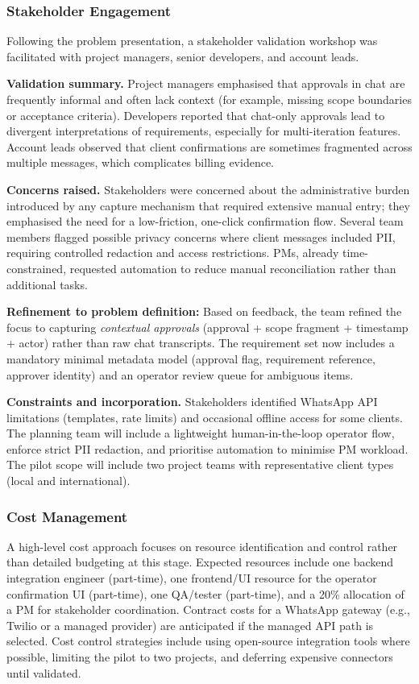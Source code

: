 \documentclass[12pt,a4paper]{report}
\begin{document}
\subsubsection{Stakeholder Engagement}
Following the problem presentation, a stakeholder validation workshop was facilitated with project managers, senior developers, and account leads.

\textbf{Validation summary.} Project managers emphasised that approvals in chat are frequently informal and often lack context (for example, missing scope boundaries or acceptance criteria). Developers reported that chat-only approvals lead to divergent interpretations of requirements, especially for multi-iteration features. Account leads observed that client confirmations are sometimes fragmented across multiple messages, which complicates billing evidence.

\textbf{Concerns raised.} Stakeholders were concerned about the administrative burden introduced by any capture mechanism that required extensive manual entry; they emphasised the need for a low-friction, one-click confirmation flow. Several team members flagged possible privacy concerns where client messages included PII, requiring controlled redaction and access restrictions. PMs, already time-constrained, requested automation to reduce manual reconciliation rather than additional tasks.

\begin{noteBox}
\textbf{Refinement to problem definition:} Based on feedback, the team refined the focus to capturing \emph{contextual approvals} (approval + scope fragment + timestamp + actor) rather than raw chat transcripts. The requirement set now includes a mandatory minimal metadata model (approval flag, requirement reference, approver identity) and an operator review queue for ambiguous items.
\end{noteBox}

\textbf{Constraints and incorporation.} Stakeholders identified WhatsApp API limitations (templates, rate limits) and occasional offline access for some clients. The planning team will include a lightweight human-in-the-loop operator flow, enforce strict PII redaction, and prioritise automation to minimise PM workload. The pilot scope will include two project teams with representative client types (local and international).

\subsubsection{Cost Management}
A high-level cost approach focuses on resource identification and control rather than detailed budgeting at this stage. Expected resources include one backend integration engineer (part-time), one frontend/UI resource for the operator confirmation UI (part-time), one QA/tester (part-time), and a 20\% allocation of a PM for stakeholder coordination. Contract costs for a WhatsApp gateway (e.g., Twilio or a managed provider) are anticipated if the managed API path is selected. Cost control strategies include using open-source integration tools where possible, limiting the pilot to two projects, and deferring expensive connectors until validated.
\end{document}
